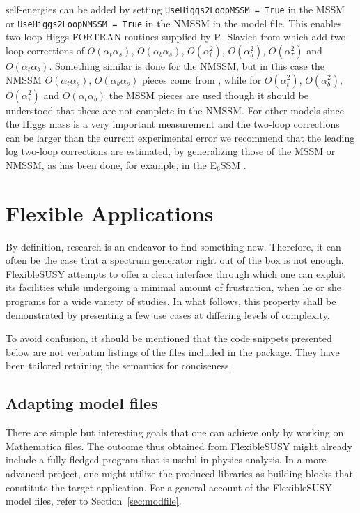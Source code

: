 \documentclass[final,3p,11pt,pdflatex]{elsarticle}
\makeatletter
\newcommand{\fs}{FlexibleSUSY\@\xspace}
\newcommand{\mathematica}{Mathematica\xspace}
\newcommand{\code}[1]{\lstinline|#1|}  %
\newcommand{\secref}[1]{Section~\ref{#1}}
\def\at{\alpha_t}
\def\ab{\alpha_b}
\def\as{\alpha_s}
\def\atau{\alpha_{\tau}}
\def\oatab{O(\at\ab)}
\def\oatas{O(\at\as)}
\def\oabas{O(\ab\as)}
\def\oatq{O(\at^2)}
\def\oabq{O(\ab^2)}
\def\oatauq{O(\atau^2)}
\makeatother
\begin{document}
self-energies can be added by setting \code{UseHiggs2LoopMSSM = True}
in the MSSM or \code{UseHiggs2LoopNMSSM = True} in the NMSSM in the
model file.  This enables two-loop Higgs FORTRAN routines supplied by
P.~Slavich from
\cite{Degrassi:2001yf,Brignole:2001jy,Dedes:2002dy,Brignole:2002bz,Dedes:2003km}
which add two-loop corrections of $\oatas$, $\oabas$, $\oatq$,
$\oabq$, $\oatauq$ and $\oatab$.  Something similar is
done for the NMSSM, but in this case the NMSSM $\oatas$, $\oabas$
pieces come from \cite{Degrassi:2009yq}, while for $\oatq$,
$\oabq$, $\oatauq$ and $\oatab$ the MSSM pieces are used
though it should be understood that these are not complete in the
NMSSM. For other models since the Higgs mass is a very important
measurement and the two-loop corrections can be larger than the
current experimental error \cite{Degrassi:2009yq} we recommend that
the leading log two-loop corrections are estimated, by generalizing
those of the MSSM or NMSSM, as has been done, for example, in the
E$_6$SSM \cite{King:2005jy}.

\section{Flexible Applications}
\label{sec:Flexible}

By definition, research is an endeavor to find something new.
Therefore, it can often be the case that
a spectrum generator right out of the box is not enough.
\fs attempts to offer a clean interface through which
one can exploit its facilities
while undergoing a minimal amount of frustration,
when he or she programs for a wide variety of studies.
In what follows,
this property shall be demonstrated by presenting a few use cases
at differing levels of complexity.

To avoid confusion,
it should be mentioned that
the code snippets presented below are not
verbatim listings of the files included in the package.
They have been tailored retaining the semantics
for conciseness.

\subsection{Adapting model files}

There are simple but interesting goals
that one can achieve only by working on
\mathematica files.
The outcome thus obtained from \fs
might already include a fully-fledged program
that is useful in physics analysis.
In a more advanced project,
one might utilize the produced libraries as building blocks
that constitute the target application.
For a general account of the \fs model files,
refer to \secref{sec:modfile}.
\end{document}
